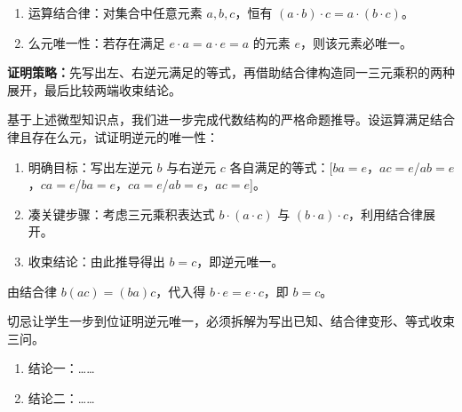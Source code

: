 \begin{probchain}
\begin{microknowledge}[重要概念/性质]
\begin{enumerate}
    \item 运算结合律：对集合中任意元素 $a, b, c$，恒有 $(a \cdot b) \cdot c = a \cdot (b \cdot c)$。
    \item 么元唯一性：若存在满足 $e \cdot a = a \cdot e = a$ 的元素 $e$，则该元素必唯一。
\end{enumerate}
\end{microknowledge}

\textbf{证明策略：}先写出左、右逆元满足的等式，再借助结合律构造同一三元乘积的两种展开，最后比较两端收束结论。

\item {} 基于上述微型知识点，我们进一步完成代数结构的严格命题推导。设运算满足结合律且存在么元，试证明逆元的唯一性：
\begin{enumerate}
    \item 明确目标：写出左逆元 $b$ 与右逆元 $c$ 各自满足的等式：\fillin[$ba=e$，$ac=e$]{25mm}[$ba=e$，$ac=e$/$ab=e$，$ca=e$/$ba=e$，$ca=e$/$ab=e$，$ac=e$]。
    \ansspace{1.2cm}
    \item 凑关键步骤：考虑三元乘积表达式 $b \cdot (a \cdot c)$ 与 $(b \cdot a) \cdot c$，利用结合律展开。
    \ansspace{1.5cm}
    \item 收束结论：由此推导得出 $b = c$，即逆元唯一。
    \ansspace{1.2cm}
\end{enumerate}
\begin{solution}
由结合律 $b(ac) = (ba)c$，代入得 $b \cdot e = e \cdot c$，即 $b = c$。
\end{solution}
\begin{teacherNote}
切忌让学生一步到位证明逆元唯一，必须拆解为写出已知、结合律变形、等式收束三问。
\end{teacherNote}

\end{probchain}

\begin{knowledgebox}[本节结论]
\begin{enumerate}
  \item 结论一：……
  \item 结论二：……
\end{enumerate}
\end{knowledgebox}
